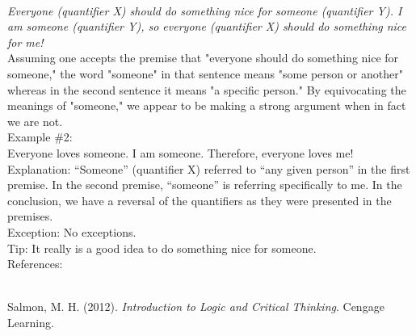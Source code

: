 \documentclass[a4paper,12pt,single,pdftex]{scrbook}
\begin{document}
    \\

    
      {\em Everyone (quantifier X) should do something nice for someone (quantifier Y). I am someone (quantifier Y), so everyone (quantifier X) should do something nice for me!}
    \\

    
      Assuming one accepts the premise that "everyone should do something nice for someone," the word "someone" in that sentence means "some person or another" whereas in the second sentence it means "a specific person." By equivocating the meanings of "someone," we appear to be making a strong argument when in fact we are not.
    \\

    
      Example \#2:
    \\

    
      Everyone loves someone. \newline
I am someone. \newline
Therefore, everyone loves me!
    \\

    
      Explanation: “Someone” (quantifier X) referred to “any given person” in the first premise. In the second premise, “someone” is referring specifically to me. In the conclusion, we have a reversal of the quantifiers as they were presented in the premises.
    \\

    
      Exception: No exceptions.
    \\

    
      Tip: It really is a good idea to do something nice for someone.
    \\

    References:

    
      
        
      \\

      
        
          Salmon, M. H. (2012). {\it Introduction to Logic and Critical Thinking}. Cengage Learning.
        
      
    
\end{document}
